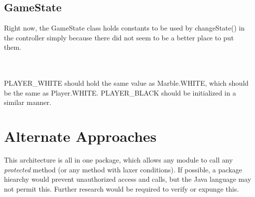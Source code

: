 \documentclass{article}
\begin{document}
\subsection{GameState}
Right now, the GameState class holds constants to be used by changeState() in the controller simply because there did not seem to be a better place to put them.

\\\\

PLAYER\_WHITE should hold the same value as Marble.WHITE, which should be the same as Player.WHITE. PLAYER\_BLACK should be initialized in a similar manner.

\section{Alternate Approaches}
This architecture is all in one package, which allows any module to call any \textit{protected} method (or any method with laxer conditions). If possible, a package hiearchy would prevent unauthorized access and calls, but the Java language may not permit this. Further research would be required to verify or expunge this.
\end{document}
